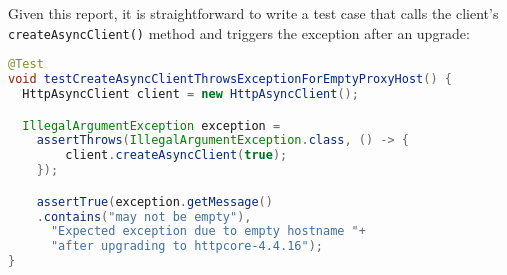 Given this report, it is straightforward to write a test case that calls the client's \texttt{createAsyncClient()} method
and triggers the exception after an upgrade:
\begin{lstlisting}[language=Java,basicstyle=\scriptsize\ttfamily]
@Test
void testCreateAsyncClientThrowsExceptionForEmptyProxyHost() {
  HttpAsyncClient client = new HttpAsyncClient();

  IllegalArgumentException exception =
    assertThrows(IllegalArgumentException.class, () -> {
        client.createAsyncClient(true);
    });

    assertTrue(exception.getMessage()
    .contains("may not be empty"),
      "Expected exception due to empty hostname "+
      "after upgrading to httpcore-4.4.16");
}
\end{lstlisting}

